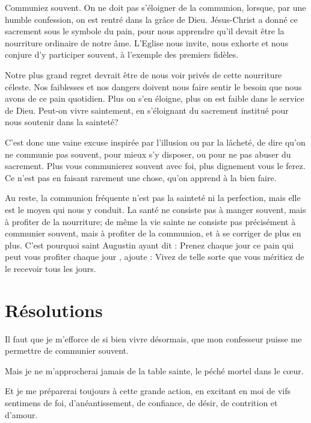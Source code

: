 \documentclass[instructions.tex]{subfiles}
\begin{document}
\tertio Communiez souvent. On ne doit pas s’éloigner de la communion, lorsque, par une humble confession, on est rentré dans la grâce de Dieu. Jésus-Christ a donné ce sacrement sous le symbole du pain, pour nous apprendre qu’il devait être la nourriture ordinaire de notre âme. L’Eglise nous invite, nous exhorte et nous conjure d’y participer souvent, à l’exemple des premiers fidèles.
 
Notre plus grand regret devrait être de nous voir privés de cette nourriture céleste. Nos faiblesses et nos dangers doivent nous faire sentir le besoin que nous avons de ce pain quotidien. Plus on s’en éloigne, plus on est faible dans le service de Dieu. Peut-on vivre saintement, en s’éloignant du sacrement institué pour nous soutenir dans la sainteté?
 
C’est donc une vaine excuse inspirée par l’illusion ou par la lâcheté, de dire qu’on ne communie pas souvent, pour mieux s’y disposer, ou pour ne pas abuser du sacrement. Plus vous communierez souvent avec foi, plus dignement vous le ferez. Ce n’est pas en faisant rarement une chose, qu’on apprend à la bien faire.
 
Au reste, la communion fréquente n’est pas la sainteté ni la perfection, mais elle est le moyen qui nous y conduit. La santé ne consiste pas à manger souvent, mais à profiter de la nourriture; de même la vie sainte ne consiste pas précisément à communier souvent, mais à profiter de la communion, et à se corriger de plus en plus. C’est pourquoi saint Augustin ayant dit : Prenez chaque jour ce pain qui peut vous profiter chaque jour , ajoute : Vivez de telle sorte que vous méritiez de le recevoir tous les jours.
 
\section{Résolutions}
 
\primo Il faut que je m’efforce de si bien vivre désormais, que mon confesseur puisse me permettre de communier souvent.
 
\secundo Mais je ne m’approcherai jamais de la table sainte, le péché mortel dans le cœur.
 
\tertio Et je me préparerai toujours à cette grande action, en excitant en moi de vifs sentimens de foi, d’anéantissement, de confiance, de désir, de contrition et d’amour.
 
 
\end{document}
